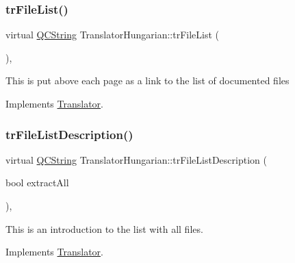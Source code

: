 \mbox{\label{class_translator_hungarian_a0480216974469aa047ebda4f6de38494}} 
\subsubsection{\texorpdfstring{trFileList()}{trFileList()}}
{\footnotesize\ttfamily virtual \mbox{\hyperlink{class_q_c_string}{Q\+C\+String}} Translator\+Hungarian\+::tr\+File\+List (\begin{DoxyParamCaption}{ }\end{DoxyParamCaption})\hspace{0.3cm}{\ttfamily [inline]}, {\ttfamily [virtual]}}

This is put above each page as a link to the list of documented files 

Implements \mbox{\hyperlink{class_translator}{Translator}}.

\mbox{\label{class_translator_hungarian_ac7eab9d4a2202cf75525b96885c90948}} 
\subsubsection{\texorpdfstring{trFileListDescription()}{trFileListDescription()}}
{\footnotesize\ttfamily virtual \mbox{\hyperlink{class_q_c_string}{Q\+C\+String}} Translator\+Hungarian\+::tr\+File\+List\+Description (\begin{DoxyParamCaption}\item[{bool}]{extract\+All }\end{DoxyParamCaption})\hspace{0.3cm}{\ttfamily [inline]}, {\ttfamily [virtual]}}

This is an introduction to the list with all files. 

Implements \mbox{\hyperlink{class_translator}{Translator}}.

\mbox{\label{class_translator_hungarian_aa20275e44c130c3bc337c6eecf3acc94}} 
